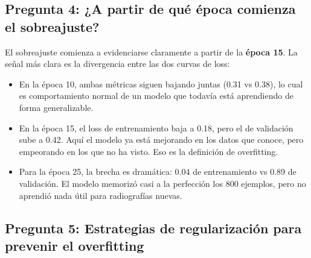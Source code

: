 \documentclass[12pt, letterpaper]{article}
\begin{document}
\subsection{Pregunta 4: ¿A partir de qué época comienza el sobreajuste?}

El sobreajuste comienza a evidenciarse claramente a partir de la \textbf{época 15}. La señal más
clara es la divergencia entre las dos curvas de loss:

\begin{itemize}[leftmargin=1.5cm]
    \item En la época 10, ambas métricas siguen bajando juntas (0.31 vs 0.38), lo cual es
    comportamiento normal de un modelo que todavía está aprendiendo de forma generalizable.

    \item En la época 15, el loss de entrenamiento baja a 0.18, pero el de validación sube a 0.42.
    Aquí el modelo ya está mejorando en los datos que conoce, pero empeorando en los que no ha visto.
    Eso es la definición de overfitting.

    \item Para la época 25, la brecha es dramática: 0.04 de entrenamiento vs 0.89 de validación.
    El modelo memorizó casi a la perfección los 800 ejemplos, pero no aprendió nada útil para
    radiografías nuevas.
\end{itemize}

\subsection{Pregunta 5: Estrategias de regularización para prevenir el overfitting}
\end{document}
